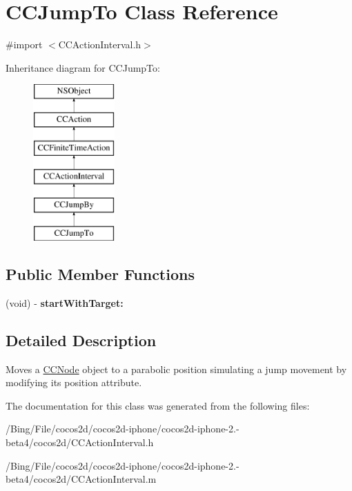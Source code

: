 \hypertarget{interface_c_c_jump_to}{\section{C\-C\-Jump\-To Class Reference}
\label{interface_c_c_jump_to}
}


{\ttfamily \#import $<$C\-C\-Action\-Interval.\-h$>$}

Inheritance diagram for C\-C\-Jump\-To\-:\begin{figure}[H]
\begin{center}
\leavevmode
\includegraphics[height=6.000000cm]{interface_c_c_jump_to}
\end{center}
\end{figure}
\subsection*{Public Member Functions}
\begin{DoxyCompactItemize}
\item 
\hypertarget{interface_c_c_jump_to_a69ceda329689e8abd44eae8653e964be}{(void) -\/ {\bfseries start\-With\-Target\-:}}\label{interface_c_c_jump_to_a69ceda329689e8abd44eae8653e964be}

\end{DoxyCompactItemize}


\subsection{Detailed Description}
Moves a \hyperlink{class_c_c_node}{C\-C\-Node} object to a parabolic position simulating a jump movement by modifying its position attribute. 

The documentation for this class was generated from the following files\-:\begin{DoxyCompactItemize}
\item 
/\-Bing/\-File/cocos2d/cocos2d-\/iphone/cocos2d-\/iphone-\/2.-\/beta4/cocos2d/C\-C\-Action\-Interval.\-h\item 
/\-Bing/\-File/cocos2d/cocos2d-\/iphone/cocos2d-\/iphone-\/2.-\/beta4/cocos2d/C\-C\-Action\-Interval.\-m\end{DoxyCompactItemize}
